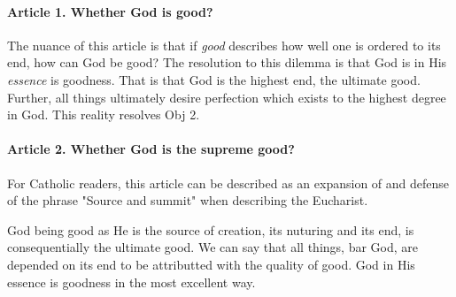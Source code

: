 \documentclass{ucetd}
\begin{document}
\paragraph{Article 1. Whether God is good?}
The nuance of this article is that if \textit{good} describes how well one is ordered to its end, how can God be good? The resolution to this dilemma is that God is in His \textit{essence} is goodness. That is that God is the highest end, the ultimate good. Further, all things ultimately desire perfection which exists to the highest degree in God. This reality resolves Obj 2.

\paragraph{Article 2. Whether God is the supreme good?}
For Catholic readers, this article can be described as an expansion of and defense of the phrase "Source and summit" when describing the Eucharist.

God being good as He is the source of creation, its nuturing and its end, is consequentially the ultimate good. We can say that all things, bar God, are depended on its end to be attributted with the quality of good. God in His essence is goodness in the most excellent way.
\end{document}
